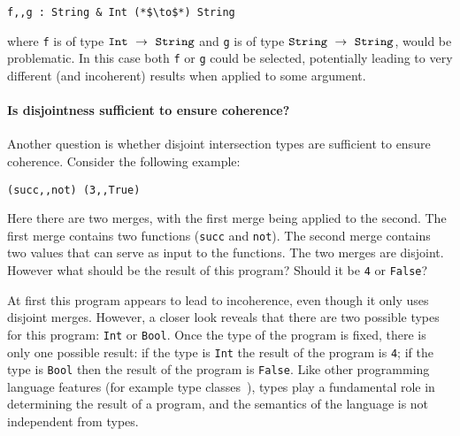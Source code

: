 \begin{lstlisting}
f,,g : String & Int (*$\to$*) String
\end{lstlisting}

\noindent where \lstinline$f$ is of type
$\texttt{Int}~\to~\texttt{String}$  and \lstinline$g$ is of type
$\texttt{String}~\to~\texttt{String}$, would be problematic. In this 
case both \lstinline$f$ or \lstinline$g$ could be selected,
potentially leading to very different (and incoherent) results when
applied to some argument. 

\begin{comment}
According to the rule the first 
two intersection types are disjoint, whereas the last one is not. This 
rule is justified in Section~\ref{}.\bruno{Should we stop here; or briefly argue 
about some justification} 

This paper proposes the 
following rule for determining the disjointness of two function types:

\begin{mathpar}
    \ruledisfun
\end{mathpar}

\noindent Here $*_i$ denotes disjointness. 
\end{comment}

\paragraph {Is disjointness sufficient to ensure coherence?} Another question
is whether disjoint intersection types are sufficient to ensure coherence. 
Consider the following example:

\begin{lstlisting}
(succ,,not) (3,,True)
\end{lstlisting}

\noindent Here there are two merges, with the first merge being applied to the second. 
The first merge contains two functions 
(\lstinline$succ$ and \lstinline$not$). The second merge contains two values 
that can serve as input to the functions. The two merges are disjoint. 
However what should be the result of this program? Should it be 
\lstinline$4$ or \lstinline$False$? 

At first this program appears to lead to incoherence, even though it only uses
disjoint merges. However, a closer look reveals that there are two possible 
types for this program: \lstinline{Int} or \lstinline{Bool}. Once the type 
of the program is fixed, there is only one possible result: if the type is 
\lstinline$Int$ the result of the program is \lstinline$4$; if the type 
is \lstinline$Bool$ then the result of the program is \lstinline$False$. 
Like other programming language features (for example type classes~\cite{Wadler89ad-hoc}), 
types play a fundamental role in determining the result of a program, and the 
semantics of the language is not independent from types. 

